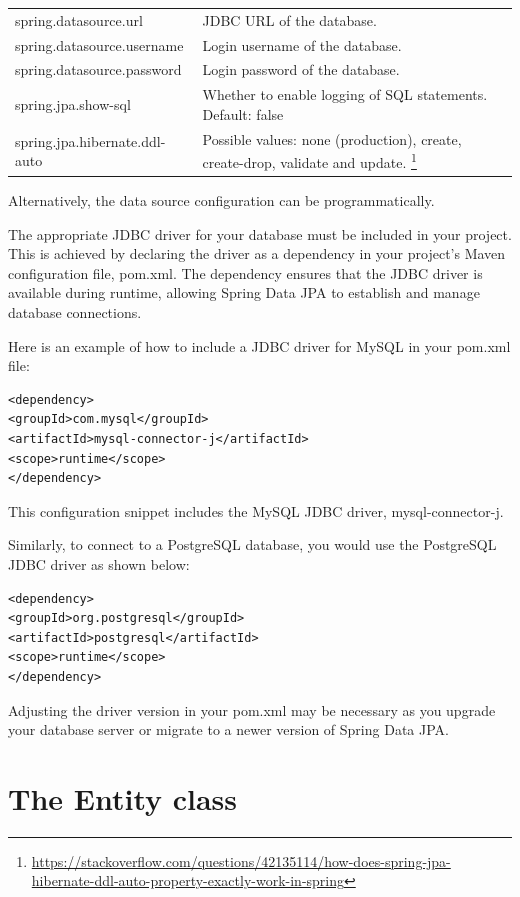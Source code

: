\begin{tabular}{|l|p{8cm}|}
\hline
spring.datasource.url & JDBC URL of the database.\\
spring.datasource.username & Login username of the database.\\
spring.datasource.password & Login password of the database.\\
spring.jpa.show-sql & Whether to enable logging of SQL statements. Default: false\\
spring.jpa.hibernate.ddl-auto & Possible values: none (production), create, create-drop, validate and update. \footnote{\url{https://stackoverflow.com/questions/42135114/how-does-spring-jpa-hibernate-ddl-auto-property-exactly-work-in-spring}}\\
\hline
\end{tabular}

Alternatively, the data source configuration can be programmatically.

The appropriate JDBC driver for your database must be included in your project. This is achieved by declaring the driver as a dependency in your project's Maven configuration file, pom.xml. The dependency ensures that the JDBC driver is available during runtime, allowing Spring Data JPA to establish and manage database connections.

Here is an example of how to include a JDBC driver for MySQL in your pom.xml file:

\begin{lstlisting}
<dependency>
<groupId>com.mysql</groupId>
<artifactId>mysql-connector-j</artifactId>
<scope>runtime</scope>
</dependency>
\end{lstlisting}

This configuration snippet includes the MySQL JDBC driver, mysql-connector-j.

Similarly,  to connect to a PostgreSQL database, you would use the PostgreSQL JDBC driver as shown below:

\begin{lstlisting}
<dependency>
<groupId>org.postgresql</groupId>
<artifactId>postgresql</artifactId>
<scope>runtime</scope>
</dependency>
\end{lstlisting}

Adjusting the driver version in your pom.xml may be necessary as you upgrade your database server or migrate to a newer version of Spring Data JPA.

\section{The Entity class}

